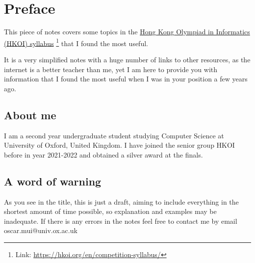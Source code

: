 \chapter*{Preface}

This piece of notes covers some topics in the \href{https://hkoi.org/en/competition-syllabus/}{Hong Kong Olympiad in Informatics (HKOI) syllabus} \footnote{Link: \href{https://hkoi.org/en/competition-syllabus/}{https://hkoi.org/en/competition-syllabus/}} that I found the most useful. 

It is a very simplified notes with a huge number of links to other resources, as the internet is a better teacher than me, yet I am here to provide you with information that I found the most useful when I was in your position a few years ago.

\section*{About me}

I am a second year undergraduate student studying Computer Science at University of Oxford, United Kingdom. I have joined the senior group HKOI before in year 2021-2022 and obtained a silver award at the finals. 

\section*{A word of warning}

As you see in the title, this is just a draft, aiming to include everything in the shortest amount of time possible, so explanation and examples may be inadequate. If there is any errors in the notes feel free to contact me by email oscar.mui@univ.ox.ac.uk

